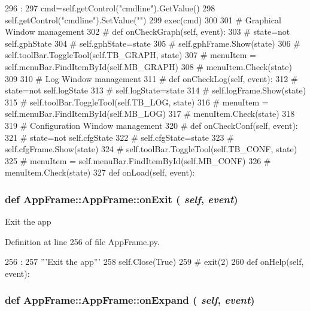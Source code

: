 \begin{DoxyCode}
296                            :
297         cmd=self.getControl("cmdline").GetValue()
298         self.getControl("cmdline").SetValue("") 
299         exec(cmd)
300  
301     # Graphical Window management    
302     # def onCheckGraph(self, event):
303     #     state=not self.gphState
304     #     self.gphState=state
305     #     self.gphFrame.Show(state)
306     #     self.toolBar.ToggleTool(self.TB_GRAPH, state)
307     #     menuItem = self.menuBar.FindItemById(self.MB_GRAPH)
308     #     menuItem.Check(state)
309 
310     # Log Window management    
311     # def onCheckLog(self, event):
312     #     state=not self.logState
313     #     self.logState=state
314     #     self.logFrame.Show(state)
315     #     self.toolBar.ToggleTool(self.TB_LOG, state)
316     #     menuItem = self.menuBar.FindItemById(self.MB_LOG)
317     #     menuItem.Check(state)
318         
319     # Configuration Window management    
320     # def onCheckConf(self, event):
321     #     state=not self.cfgState
322     #     self.cfgState=state
323     #     self.cfgFrame.Show(state)
324     #     self.toolBar.ToggleTool(self.TB_CONF, state)
325     #     menuItem = self.menuBar.FindItemById(self.MB_CONF)
326     #     menuItem.Check(state)
327 
    def onLoad(self, event):
\end{DoxyCode}
\hypertarget{classAppFrame_1_1AppFrame_a5b5cb5f928c331e97fd7ffcee5458bcf}{
\subsubsection[{onExit}]{\setlength{\rightskip}{0pt plus 5cm}def AppFrame::AppFrame::onExit ( {\em self}, \/   {\em event})}}
\label{classAppFrame_1_1AppFrame_a5b5cb5f928c331e97fd7ffcee5458bcf}
\begin{DoxyVerb}Exit the app\end{DoxyVerb}
 

Definition at line 256 of file AppFrame.py.


\begin{DoxyCode}
256                            :
257         '''Exit the app'''
258         self.Close(True)
259 #        exit(2)
260 
    def onHelp(self, event):
\end{DoxyCode}
\hypertarget{classAppFrame_1_1AppFrame_a66183c68b99e1849cb3a009aacf46578}{
\subsubsection[{onExpand}]{\setlength{\rightskip}{0pt plus 5cm}def AppFrame::AppFrame::onExpand ( {\em self}, \/   {\em event})}}
\label{classAppFrame_1_1AppFrame_a66183c68b99e1849cb3a009aacf46578}


